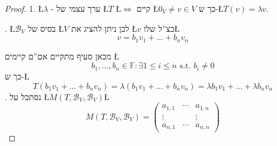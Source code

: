 \documentclass[english,hebrew]{article}
\theoremstyle{plain}
\begin{document}
\begin{proof}
1. \L{$\lambda$} - ערך עצמי של \L{$T$} \L{$\iff$} קיים \L{$0_{V}\ne v\in V$}
כך ש-\L{$T(v)=\lambda v$}.

{\endL}. \L{$\mathcal{B}_{V}$} בסיס של \L{$V$} לכן ניתן
להציג את \L{$v$} כצ\textquotedblright ל שלו\L{%
\[
v=b_{1}v_{1}+\dots+b_{n}v_{n}
\]
}%

מכאן סעיף {\endL} מתקיים אם\textquotedblright ם קיימים \L{%
\[
b_{1},\dots,b_{n}\in\mathbb{F}:\exists1\le i\le n\text{ s.t. }b_{i}\ne0
\]
}%
 כך ש-\L{%
\[
T\left(b_{1}v_{1}+\dots+b_{n}v_{n}\right)=\lambda\left(b_{1}v_{1}+\dots+b_{n}v_{n}\right)=\lambda b_{1}v_{1}+\dots+\lambda b_{n}v_{n}
\]
}%
{\endL}. נסתכל על \L{$M(T,\mathcal{B}_{V},\mathcal{B}_{V})$}\L{%
\[
M(T,\mathcal{B}_{V},\mathcal{B}_{V})=\begin{pmatrix}a_{1,1} & \cdots & a_{1,n}\\
\vdots &  & \vdots\\
a_{n,1} & \cdots & a_{n,n}
\end{pmatrix}
\]
}%


\end{proof}
\end{document}
